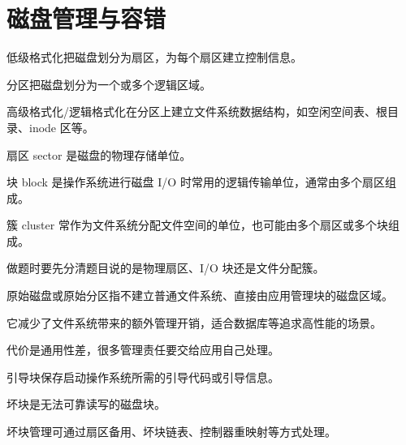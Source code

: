 \section{磁盘管理与容错}
\begin{points}
  \item 低级格式化把磁盘划分为扇区，为每个扇区建立控制信息。
  \item 分区把磁盘划分为一个或多个逻辑区域。
  \item 高级格式化/逻辑格式化在分区上建立文件系统数据结构，如空闲空间表、根目录、inode 区等。
\end{points}


\begin{points}
  \item 扇区 sector 是磁盘的物理存储单位。
  \item 块 block 是操作系统进行磁盘 I/O 时常用的逻辑传输单位，通常由多个扇区组成。
  \item 簇 cluster 常作为文件系统分配文件空间的单位，也可能由多个扇区或多个块组成。
  \item 做题时要先分清题目说的是物理扇区、I/O 块还是文件分配簇。
\end{points}


\begin{points}
  \item 原始磁盘或原始分区指不建立普通文件系统、直接由应用管理块的磁盘区域。
  \item 它减少了文件系统带来的额外管理开销，适合数据库等追求高性能的场景。
  \item 代价是通用性差，很多管理责任要交给应用自己处理。
\end{points}


\begin{points}
  \item 引导块保存启动操作系统所需的引导代码或引导信息。
  \item 坏块是无法可靠读写的磁盘块。
  \item 坏块管理可通过扇区备用、坏块链表、控制器重映射等方式处理。
\end{points}


